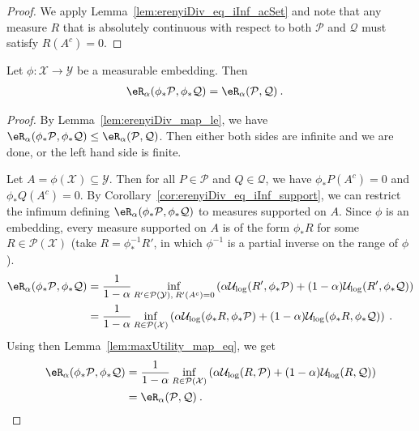 \begin{proof}
We apply Lemma~\ref{lem:erenyiDiv_eq_iInf_acSet} and note that any measure $R$ that is absolutely continuous with respect to both $\mathcal{P}$ and $\mathcal{Q}$ must satisfy $R(A^c) = 0$.
\end{proof}


\begin{lemma}\label{lem:erenyiDiv_map_eq}
Let $\phi : \mathcal{X} \to \mathcal{Y}$ be a measurable embedding. Then
\begin{align*}
  \eR_\alpha(\phi_*\mathcal{P}, \phi_*\mathcal{Q})
  &= \eR_\alpha(\mathcal{P}, \mathcal{Q})
  \: .
\end{align*}
\end{lemma}

\begin{proof}
By Lemma~\ref{lem:erenyiDiv_map_le}, we have $\eR_\alpha(\phi_*\mathcal{P}, \phi_*\mathcal{Q}) \le \eR_\alpha(\mathcal{P}, \mathcal{Q})$.
Then either both sides are infinite and we are done, or the left hand side is finite.

Let $A = \phi(\mathcal{X}) \subseteq \mathcal{Y}$.
Then for all $P \in \mathcal{P}$ and $Q \in \mathcal{Q}$, we have $\phi_* P(A^c) = 0$ and $\phi_* Q(A^c) = 0$.
By Corollary~\ref{cor:erenyiDiv_eq_iInf_support}, we can restrict the infimum defining $\eR_\alpha(\phi_*\mathcal{P}, \phi_*\mathcal{Q})$ to measures supported on $A$.
Since $\phi$ is an embedding, every measure supported on $A$ is of the form $\phi_* R$ for some $R \in \mathcal{P}(\mathcal{X})$ (take $R = \phi^{-1}_* R'$, in which $\phi^{-1}$ is a partial inverse on the range of $\phi$).
\begin{align*}
  \eR_\alpha(\phi_*\mathcal{P}, \phi_*\mathcal{Q})
  &= \frac{1}{1 - \alpha} \inf_{R' \in \mathcal{P}(\mathcal{Y}), \: R'(A^c) = 0} \left( \alpha \mathcal{U}_{\log}(R', \phi_* \mathcal{P}) + (1 - \alpha) \mathcal{U}_{\log}(R', \phi_* \mathcal{Q}) \right)
  \\
  &= \frac{1}{1 - \alpha} \inf_{R \in \mathcal{P}(\mathcal{X})} \left( \alpha \mathcal{U}_{\log}(\phi_* R, \phi_* \mathcal{P}) + (1 - \alpha) \mathcal{U}_{\log}(\phi_* R, \phi_* \mathcal{Q}) \right)
  \: .
\end{align*}
Using then Lemma~\ref{lem:maxUtility_map_eq}, we get
\begin{align*}
  \eR_\alpha(\phi_*\mathcal{P}, \phi_*\mathcal{Q})
  &= \frac{1}{1 - \alpha} \inf_{R \in \mathcal{P}(\mathcal{X})} \left( \alpha \mathcal{U}_{\log}(R, \mathcal{P}) + (1 - \alpha) \mathcal{U}_{\log}(R, \mathcal{Q}) \right)
  \\
  &= \eR_\alpha(\mathcal{P}, \mathcal{Q})
  \: .
\end{align*}
\end{proof}


